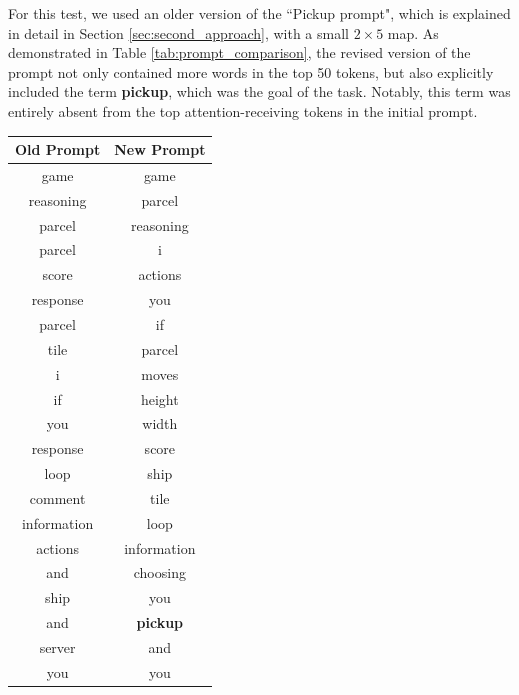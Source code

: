 For this test, we used an older version of the ``Pickup prompt", which is explained
in detail in Section \ref{sec:second_approach}, with a small $2 \times 5$ map. As
demonstrated in Table \ref{tab:prompt_comparison}, the revised version of the
prompt not only contained more words in the top 50 tokens, but also explicitly included
the term \textbf{pickup}, which was the goal of the task. Notably, this term was
entirely absent from the top attention-receiving tokens in the initial prompt.

\begin{table}[ht]
  \centering
  \begin{tabular}{|c|c|}
    \hline
    \textbf{Old Prompt} & \textbf{New Prompt} \\
    \hline
    game                & game                \\
    reasoning           & parcel              \\
    parcel              & reasoning           \\
    parcel              & i                   \\
    score               & actions             \\
    response            & you                 \\
    parcel              & if                  \\
    tile                & parcel              \\
    i                   & moves               \\
    if                  & height              \\
    you                 & width               \\
    response            & score               \\
    loop                & ship                \\
    comment             & tile                \\
    information         & loop                \\
    actions             & information         \\
    and                 & choosing            \\
    ship                & you                 \\
    and                 & \textbf{pickup}     \\
    server              & and                 \\
    you                 & you                 \\

\end{tabular}
\end{table}
